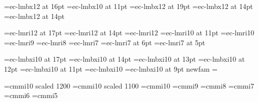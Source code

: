 
\font\chiffre=ec-lmbx12 at 16pt%
\font\gras=ec-lmbx10 at 11pt%
\font\TIT=ec-lmbx12 at 19pt%
\font\titre=ec-lmbx12 at 14pt%
\font\pti=ec-lmbx12 at 14pt%

% 

\font\seventeenit=ec-lmri12 at 17pt%
\font\fourteenit=ec-lmri12 at 14pt%
\font\twelveit=ec-lmri12%
\font\elevenit=ec-lmri10 at 11pt%
\font\tenit=ec-lmri10%
\font\nineit=ec-lmri9%
\font\eightit=ec-lmri8%
\font\sevenit=ec-lmri7%
\font\sixit=ec-lmri7 at 6pt%
\font\fiveit=ec-lmri7 at 5pt%

% 

\font\seventeenti=ec-lmbxi10 at 17pt%
\font\fourteenti=ec-lmbxi10 at 14pt%
\font\thirteenti=ec-lmbxi10 at 13pt%
\font\twelveti=ec-lmbxi10 at 12pt%
\font\eleventi=ec-lmbxi10 at 11pt%
\font\tenti=ec-lmbxi10%
\font\nineti=ec-lmbxi10 at 9pt%
\csname newfam\endcsname\bolditfam
\textfont\bolditfam=\tenti
\def\boldit{\fam\bolditfam\tenti}


% 

\font\twelvei=cmmi10 scaled 1200
\font\eleveni=cmmi10 scaled 1100
\font\teni=cmmi10
\font\ninei=cmmi9
\font\eighti=cmmi8
\font\seveni=cmmi7
\font\sixi=cmmi6
\font\fivei=cmmi5


